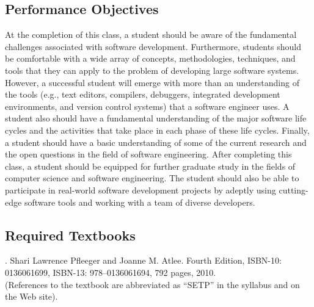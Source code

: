 \documentclass[11pt]{article}
\begin{document}
\subsection*{Performance Objectives}

At the completion of this class, a student should be aware of the fundamental challenges associated with software
development. Furthermore, students should be comfortable with a wide array of concepts, methodologies, techniques, and
tools that they can apply to the problem of developing large software systems. However, a successful student will
emerge with more than an understanding of the tools (e.g., text editors, compilers, debuggers, integrated development
environments, and version control systems) that a software engineer uses. A student also should have a fundamental
understanding of the major software life cycles and the activities that take place in each phase of these life cycles.
Finally, a student should have a basic understanding of some of the current research and the open questions in the field
of software engineering. After completing this class, a student should be equipped for further graduate study in the
fields of computer science and software engineering. The student should also be able to participate in real-world
software development projects by adeptly using cutting-edge software tools and working with a team of diverse
developers.

\subsection*{Required Textbooks}


. Shari Lawrence Pfleeger and Joanne M. Atlee.
Fourth Edition, ISBN-10: 0136061699, ISBN-13: 978--0136061694, 792 pages, 2010. \\
(References to the textbook are abbreviated as ``SETP'' in the syllabus and on the Web site).

\end{document}
